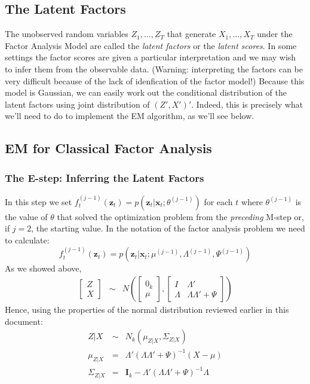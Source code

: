 \documentclass[12pt]{article}
\theoremstyle{definition}
\begin{document}
\subsection{The Latent Factors}
The unobserved random variables $Z_1, \hdots, Z_T$ that generate $X_1, \hdots, X_T$ under the Factor Analysis Model are called the \emph{latent factors} or the \emph{latent scores}. In some settings the factor scores are given a particular interpretation and we may wish to infer them from the observable data. (Warning: interpreting the factors can be very difficult because of the lack of idenfication of the factor model!) Because this model is Gaussian, we can easily work out the conditional distribution of the latent factors using joint distribution of $(Z',X')'$. Indeed, this is precisely what we'll need to do to implement the EM algorithm, as we'll see below. 


\subsection{EM for Classical Factor Analysis}

\subsubsection{The E-step: Inferring the Latent Factors} In this step we set $f_t^{(j-1)}(\mathbf{z}_t) = p(\mathbf{z}_t|\mathbf{x}_t; \theta^{(j-1)})$ for each $t$ where $\theta^{(j-1)}$ is the value of $\theta$ that solved the optimization problem from the \emph{preceding} M-step or, if $j=2$, the starting value. In the notation of the factor analysis problem we need to calculate:
	$$f_t^{(j-1)}(\mathbf{z}_t) = p(\mathbf{z}_t | \mathbf{x}_t; \mu^{(j-1)}, \Lambda^{(j-1)}, \Psi^{(j-1)})$$
As we showed above,
	\begin{eqnarray*}
		\left[\begin{array}{c}
			Z\\ X
		\end{array}\right] 
		&\sim&  N\left(
		\left[\begin{array}{c}
			0_k \\ \mu
	\end{array}\right], 
		\left[\begin{array}{cc}
			I & \Lambda'\\
			\Lambda & \Lambda \Lambda' + \Psi
		\end{array} \right] \right)
	\end{eqnarray*}
Hence, using the properties of the normal distribution reviewed earlier in this document:
	\begin{eqnarray*}
		Z|X &\sim& N_k(\mu_{Z|X}, \Sigma_{Z|X})\\
		\mu_{Z|X} &=& \Lambda' (\Lambda \Lambda' + \Psi)^{-1}(X - \mu) \\
		\Sigma_{Z|X} &=& \mathbf{I}_k - \Lambda'(\Lambda \Lambda' + \Psi)^{-1}\Lambda
	\end{eqnarray*}
\end{document}

